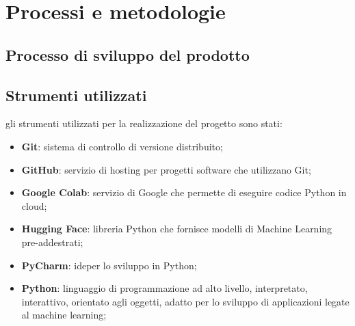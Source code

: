\chapter{Processi e metodologie}
\label{chap:processi-metodologie}

\section{Processo di sviluppo del prodotto}
\section{Strumenti utilizzati}
gli strumenti utilizzati per la realizzazione del progetto sono stati:
\begin{itemize}
    \item \textbf{Git}: sistema di controllo di versione distribuito;
    \item \textbf{GitHub}: servizio di hosting per progetti software che utilizzano Git;
    \item \textbf{Google Colab}: servizio di Google che permette di eseguire codice Python in cloud;
    \item \textbf{Hugging Face}: libreria Python che fornisce modelli di Machine Learning pre-addestrati;
    \item \textbf{PyCharm}: \gls{ide}\glox per lo sviluppo in Python;
    \item \textbf{Python}: linguaggio di programmazione ad alto livello, interpretato, interattivo, orientato agli oggetti, adatto per lo sviluppo di applicazioni legate al machine learning;
\end{itemize}

\newpage